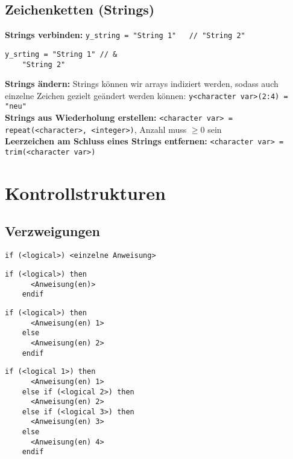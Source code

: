 \documentclass[a4paper, twocolumn]{scrarticle}
\begin{document}
  \subsection{Zeichenketten (\glqq Strings\grqq)}
  \textbf{ Strings verbinden:} \lstinline|y_string = "String 1"   // "String 2"|
  \begin{lstlisting}[caption={\bfseries String-Verkettung über Code-Zeilen hinweg},label=lst:stringkette]
    y_srting = "String 1" // &
    "String 2"
  \end{lstlisting}
  \textbf{Strings ändern:} Strings können wir arrays indiziert werden, sodass auch einzelne Zeichen gezielt geändert werden können: \lstinline|y<character var>(2:4) = "neu"|\\
  \textbf{Strings aus Wiederholung erstellen:} \lstinline|<character var> = repeat(<character>, <integer>)|, Anzahl muss $\geq 0$ sein\\
  \textbf{Leerzeichen am Schluss eines Strings entfernen:} \lstinline|<character var> = trim(<character var>)|\\
  
  \section{Kontrollstrukturen}
  \subsection{Verzweigungen}
  \begin{lstlisting}[caption={\bfseries Einzeilige if-Anweisung}]
    if (<logical>) <einzelne Anweisung>
  \end{lstlisting}
  \begin{lstlisting}[caption={if-then}]
    if (<logical>) then
      <Anweisung(en)>
    endif
  \end{lstlisting}
  \begin{lstlisting}[caption={\bfseries if-then-else}]
    if (<logical>) then
      <Anweisung(en) 1>
    else
      <Anweisung(en) 2>
    endif
  \end{lstlisting}
  \begin{lstlisting}[caption={\bfseries if-then-else-if-...-else}]
    if (<logical 1>) then
      <Anweisung(en) 1>
    else if (<logical 2>) then
      <Anweisung(en) 2>
    else if (<logical 3>) then
      <Anweisung(en) 3>
    else
      <Anweisung(en) 4>
    endif
  \end{lstlisting}
\end{document}
